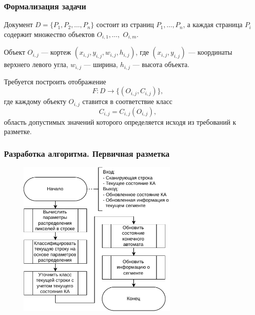 \documentclass[gray]{beamer}
\begin{document}
\begin{frame}
    \frametitle{Формализация задачи}

    Документ $ D = \{ P_1, P_2, \dots, P_n \} $ состоит из страниц $ P_1, \dots, P_n $, а каждая страница $ P_i $ содержит множество объектов $ O_{i,1}, \dots, $ $O_{i,m} $.

    \vspace{0.2cm}

    Объект $O_{i,j}$ --- кортеж $(x_{i,j}, y_{i,j}, w_{i,j}, h_{i,j})$, где $(x_{i,j}, y_{i,j})$ --- координаты верхнего левого угла, $w_{i,j}$ --- ширина, $h_{i,j}$ --- высота объекта.

    \vspace{0.2cm}

    Требуется построить отображение
    $$
        F : D \to \{(O_{i,j}, C_{i,j})\},
    $$
    где каждому объекту $O_{i,j}$ ставится в соответствие класс
    $$
        C_{i,j} = C_{i,j}(O_{i,j}),
    $$
    область допустимых значений которого определяется исходя из требований к разметке.
\end{frame}

\begin{frame}
    \frametitle{Разработка алгоритма. Первичная разметка}

    \begin{figure}[H]
        \centering
        \includegraphics[width=0.7\textwidth]{diag/primary.pdf}
    \end{figure}
\end{frame}
\end{document}
